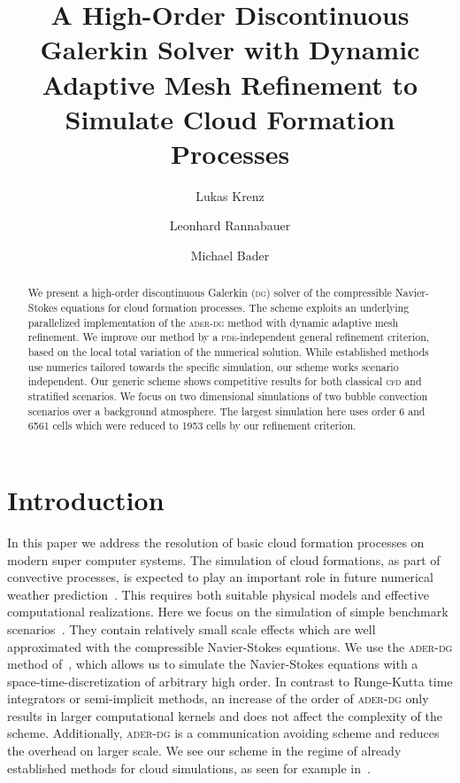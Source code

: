 \documentclass[runningheads]{llncs}
\title{A High-Order Discontinuous Galerkin Solver with Dynamic Adaptive Mesh Refinement to Simulate Cloud Formation Processes }
\author{Lukas Krenz\orcidID{0000-0001-6378-0778} \and Leonhard Rannabauer \and Michael Bader}
\institute{Department of Informatics, Technical University of Munich\\
  \email{lukas.krenz@in.tum.de}, \email{rannabau@in.tum.de}, \email{bader@in.tum.de}
}
\newcommand{\dg}{\textsc{dg}}
\newcommand{\aderdg}{\textsc{ader-dg}}
\newcommand{\pde}{\textsc{pde}}
\begin{document}
\maketitle 
\begin{abstract}
We present a high-order discontinuous Galerkin (\dg{}) solver of the compressible Navier-Stokes equations for cloud formation processes.
The scheme exploits an underlying parallelized implementation of the \aderdg{} method with dynamic adaptive mesh refinement. 
We improve our method by a \pde{}-independent general refinement criterion, based on the local total variation of the numerical solution.
While established methods use numerics tailored towards the specific simulation, our scheme works scenario independent.
Our generic scheme shows competitive results for both classical \textsc{cfd} and stratified scenarios.
We focus on two dimensional simulations of two bubble convection scenarios over a background atmosphere.
The largest simulation here uses order 6 and 6561 cells which were reduced to 1953 cells by our refinement criterion.
%
\keywords{\aderdg{}  \and Navier-Stokes \and Adaptive Mesh Refinement}
\end{abstract}
\section{Introduction}
In this paper we address the resolution of basic cloud formation processes on modern super computer systems.
The simulation of cloud formations, as part of convective processes, is expected to play an important role in future numerical weather prediction~\cite{bauer2015quiet}.
This requires both suitable physical models and effective computational realizations. 
Here we focus on the simulation of simple benchmark scenarios~\cite{giraldo2008study}.
They contain relatively small scale effects which are well approximated with the compressible Navier-Stokes equations.
We use the \aderdg{} method of~\cite{dumbser2008unified}, which allows us to simulate the Navier-Stokes equations with a space-time-discretization of arbitrary high order.
In contrast to Runge-Kutta time integrators or semi-implicit methods, an increase of the order of \aderdg{} only results in larger computational kernels and does not affect the complexity of the scheme.
Additionally, \aderdg{} is a communication avoiding scheme and reduces the overhead on larger scale.
We see our scheme in the regime of already established methods for cloud simulations, as seen for example in~\cite{giraldo2008study,muller2010adaptive,muller2018strong}.
\end{document}
